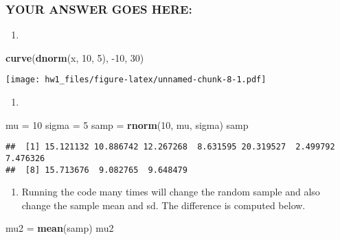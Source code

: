 \documentclass[
]{article}
\newenvironment{Shaded}{\begin{snugshade}}{\end{snugshade}}
\newcommand{\DecValTok}[1]{\textcolor[rgb]{0.00,0.00,0.81}{#1}}
\newcommand{\KeywordTok}[1]{\textcolor[rgb]{0.13,0.29,0.53}{\textbf{#1}}}
\newcommand{\NormalTok}[1]{#1}
\newcommand{\StringTok}[1]{\textcolor[rgb]{0.31,0.60,0.02}{#1}}
\providecommand{\tightlist}{%
  \setlength{\itemsep}{0pt}\setlength{\parskip}{0pt}}
\begin{document}
\hypertarget{your-answer-goes-here-1}{%
\subsubsection{YOUR ANSWER GOES HERE:}\label{your-answer-goes-here-1}}

\begin{enumerate}
\def\labelenumi{\arabic{enumi}.}
\tightlist
\item
\end{enumerate}

\begin{Shaded}
\begin{Highlighting}[]
\KeywordTok{curve}\NormalTok{(}\KeywordTok{dnorm}\NormalTok{(x, }\DecValTok{10}\NormalTok{, }\DecValTok{5}\NormalTok{), }\DecValTok{{-}10}\NormalTok{, }\DecValTok{30}\NormalTok{)}
\end{Highlighting}
\end{Shaded}

\texttt{[image: hw1\_files/figure-latex/unnamed-chunk-8-1.pdf]}

\begin{enumerate}
\def\labelenumi{\arabic{enumi}.}
\setcounter{enumi}{1}
\tightlist
\item
\end{enumerate}

\begin{Shaded}
\begin{Highlighting}[]
\NormalTok{mu =}\StringTok{ }\DecValTok{10}
\NormalTok{sigma =}\StringTok{ }\DecValTok{5}
\NormalTok{samp =}\StringTok{ }\KeywordTok{rnorm}\NormalTok{(}\DecValTok{10}\NormalTok{, mu, sigma)}
\NormalTok{samp}
\end{Highlighting}
\end{Shaded}

\begin{verbatim}
##  [1] 15.121132 10.886742 12.267268  8.631595 20.319527  2.499792  7.476326
##  [8] 15.713676  9.082765  9.648479
\end{verbatim}

\begin{enumerate}
\def\labelenumi{\arabic{enumi}.}
\setcounter{enumi}{2}
\tightlist
\item
  Running the code many times will change the random sample and also
  change the sample mean and sd. The difference is computed below.
\end{enumerate}

\begin{Shaded}
\begin{Highlighting}[]
\NormalTok{mu2 =}\StringTok{ }\KeywordTok{mean}\NormalTok{(samp)}
\NormalTok{mu2}
\end{Highlighting}
\end{Shaded}
\end{document}
